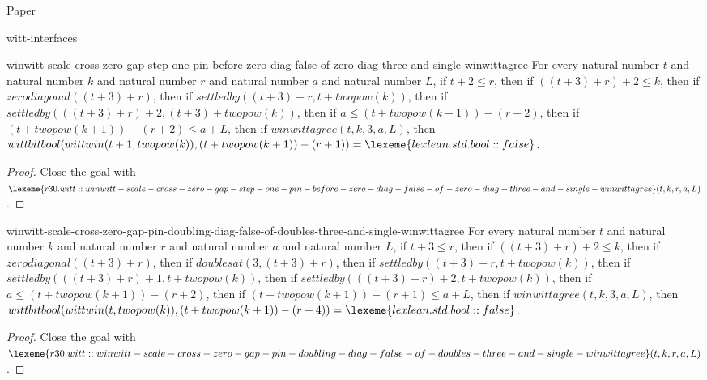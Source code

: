 \begin{lexlean}{Paper}
\begin{section}{witt-interfaces}
  \begin{theorem}{winwitt-scale-cross-zero-gap-step-one-pin-before-zero-diag-false-of-zero-diag-three-and-single-winwittagree}
  For every natural number \(t\) and natural number \(k\) and natural number \(r\) and natural number \(a\) and natural number \(L\), if \(t + 2 ≤ r\), then if \(((t + 3) + r) + 2 ≤ k\), then if \(zerodiagonal((t + 3) + r)\), then if \(settledby((t + 3) + r, t + twopow(k))\), then if \(settledby(((t + 3) + r) + 2, (t + 3) + twopow(k))\), then if \(a ≤ (t + twopow(k + 1)) - (r + 2)\), then if \((t + twopow(k + 1)) - (r + 2) ≤ a + L\), then if \(winwittagree(t, k, 3, a, L)\), then \(wittbitbool(wittwin(t + 1, twopow(k)), (t + twopow(k + 1)) - (r + 1)) = \lexeme{lexlean.std.bool::false}\).
  \begin{proof}
  Close the goal with \(\lexeme{r30.witt::winwitt-scale-cross-zero-gap-step-one-pin-before-zero-diag-false-of-zero-diag-three-and-single-winwittagree}(t, k, r, a, L)\).
  \end{proof}
  \end{theorem}

  \begin{theorem}{winwitt-scale-cross-zero-gap-pin-doubling-diag-false-of-doubles-three-and-single-winwittagree}
  For every natural number \(t\) and natural number \(k\) and natural number \(r\) and natural number \(a\) and natural number \(L\), if \(t + 3 ≤ r\), then if \(((t + 3) + r) + 2 ≤ k\), then if \(zerodiagonal((t + 3) + r)\), then if \(doublesat(3, (t + 3) + r)\), then if \(settledby((t + 3) + r, t + twopow(k))\), then if \(settledby(((t + 3) + r) + 1, t + twopow(k))\), then if \(settledby(((t + 3) + r) + 2, t + twopow(k))\), then if \(a ≤ (t + twopow(k + 1)) - (r + 2)\), then if \((t + twopow(k + 1)) - (r + 1) ≤ a + L\), then if \(winwittagree(t, k, 3, a, L)\), then \(wittbitbool(wittwin(t, twopow(k)), (t + twopow(k + 1)) - (r + 4)) = \lexeme{lexlean.std.bool::false}\).
  \begin{proof}
  Close the goal with \(\lexeme{r30.witt::winwitt-scale-cross-zero-gap-pin-doubling-diag-false-of-doubles-three-and-single-winwittagree}(t, k, r, a, L)\).
  \end{proof}
  \end{theorem}


\end{section}
\end{lexlean}
